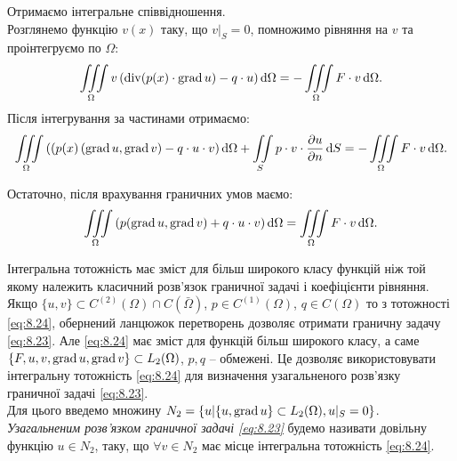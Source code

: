 Отримаємо інтегральне співвідношення. \\

Розглянемо функцію $v(x)$ таку, що $v|_S = 0$, помножимо рівняння на $v$ та проінтегруємо по $\Omega$:
\begin{equation*}
	\displaystyle\iiint\limits_\Omega v \left( \operatorname{div} (p(x) \cdot \operatorname{grad} u) - q \cdot u \right) \mathop{}\!\mathrm{d} \Omega = - \displaystyle\iiint\limits_\Omega F \cdot v \mathop{}\!\mathrm{d} \Omega.
\end{equation*}
Після інтегрування за частинами отримаємо:
\begin{equation*}
	\displaystyle\iiint\limits_\Omega \left( (p(x) \left( \operatorname{grad} u, \operatorname{grad} v \right) - q \cdot u \cdot v \right) \mathop{}\!\mathrm{d} \Omega + \displaystyle\iint\limits_S p \cdot v \cdot \frac{\partial u}{\partial n} \mathop{}\!\mathrm{d} S = - \displaystyle\iiint\limits_\Omega F \cdot v \mathop{}\!\mathrm{d} \Omega.
\end{equation*}

Остаточно, після врахування граничних умов маємо:
\begin{equation}
	\label{eq:8.24}
	\displaystyle\iiint\limits_\Omega \left( p (\operatorname{grad} u, \operatorname{grad} v) + q \cdot u \cdot v \right) \mathop{}\!\mathrm{d} \Omega = \displaystyle\iiint\limits_\Omega F \cdot v \mathop{}\!\mathrm{d} \Omega.
\end{equation}

Інтегральна тотожність має зміст для більш широкого класу функцій ніж той якому належить класичний розв'язок граничної задачі і коефіцієнти рівняння. \\

Якщо $\{u, v\} \subset C^{(2)} (\Omega) \cap C(\bar \Omega)$, $p \in C^{(1)} (\Omega)$, $q \in C(\Omega)$ то з тотожності \eqref{eq:8.24}, обернений ланцюжок перетворень дозволяє отримати граничну задачу \eqref{eq:8.23}. Але \eqref{eq:8.24} має зміст для функцій більш широкого класу, а саме $\{F, u, v, \operatorname{grad} u, \operatorname{grad} v\} \subset L_2(\Omega)$, $p, q$ -- обмежені. Це дозволяє використовувати інтегральну тотожність \eqref{eq:8.24} для визначення узагальненого розв'язку граничної задачі \eqref{eq:8.23}. \\

Для цього введемо множину $N_2 = \{ u | \{u, \operatorname{grad} u\} \subset L_2(\Omega), u|_S = 0\} $. \\

\textit{Узагальненим розв'язком граничної задачі \eqref{eq:8.23}} будемо називати
довільну функцію $u \in N_2$, таку, що $\forall v \in N_2$ має місце інтегральна тотожність
\eqref{eq:8.24}.


